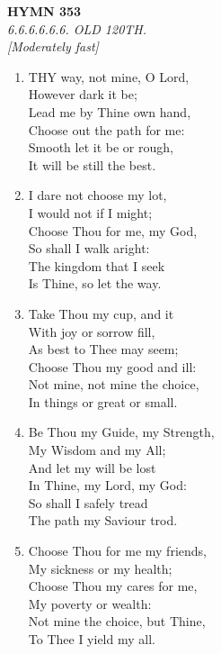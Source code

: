 \documentclass[11pt,a4paper]{article}
\begin{document}
\newpage
\begin{center}
    {\Large \textbf{HYMN 353}}
    \\
    \textit{6.6.6.6.6.6. OLD 120TH.}
    \\
    \textit{\small [Moderately fast]}
\end{center}
\vspace{1em}

\begin{enumerate}
    \item THY way, not mine, O Lord, \\
        However dark it be; \\
        Lead me by Thine own hand, \\
        Choose out the path for me: \\
        Smooth let it be or rough, \\
        It will be still the best.

    \item I dare not choose my lot, \\
        I would not if I might; \\
        Choose Thou for me, my God, \\
        So shall I walk aright: \\
        The kingdom that I seek \\
        Is Thine, so let the way.

    \item Take Thou my cup, and it \\
        With joy or sorrow fill, \\
        As best to Thee may seem; \\
        Choose Thou my good and ill: \\
        Not mine, not mine the choice, \\
        In things or great or small.

    \item Be Thou my Guide, my Strength, \\
        My Wisdom and my All; \\
        And let my will be lost \\
        In Thine, my Lord, my God: \\
        So shall I safely tread \\
        The path my Saviour trod.

    \item Choose Thou for me my friends, \\
        My sickness or my health; \\
        Choose Thou my cares for me, \\
        My poverty or wealth: \\
        Not mine the choice, but Thine, \\
        To Thee I yield my all.


\end{enumerate}
\end{document}
